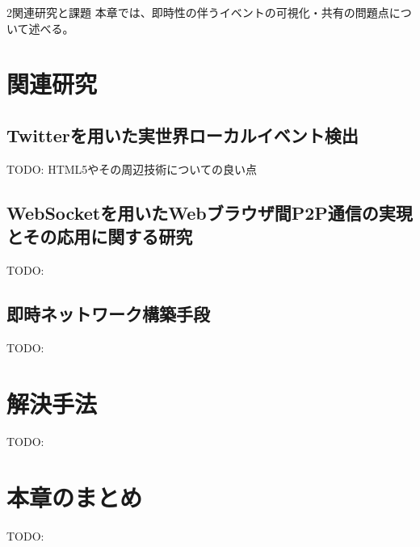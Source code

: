 \chapterhead
{2}{関連研究と課題}
{本章では、即時性の伴うイベントの可視化・共有の問題点について述べる。}

\section{関連研究}
\subsection{Twitterを用いた実世界ローカルイベント検出}
TODO: HTML5やその周辺技術についての良い点
\subsection{WebSocketを用いたWebブラウザ間P2P通信の実現とその応用に関する研究}
TODO:

\subsection{即時ネットワーク構築手段}
TODO:


\newpage

\section{解決手法}
TODO:

\section{本章のまとめ}
TODO:
